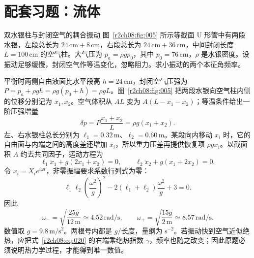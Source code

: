 \clearpage
\section{配套习题：流体}
\label{r2ch08:sec:practice}

\begin{practicebox}{双水银柱与封闭空气的耦合振动}
图~\ref{r2ch08:fig:005} 所示等截面 U 形管中有两段水银，左段总长为 $24\,\mathrm{cm}+8\,\mathrm{cm}$，右段总长为 $24\,\mathrm{cm}+36\,\mathrm{cm}$，中间封闭长度 $L=100\,\mathrm{cm}$ 的空气柱。大气压为 $p_a=\rho g p_0$，其中 $p_0=76\,\mathrm{cm}$，$\rho$ 是水银密度。设振动足够缓慢，封闭空气作等温变化，忽略阻力。求小振动的两个本征角频率。
\label{r2ch08:pr:001}
\begin{solution}
\figUTubeModes
平衡时两侧自由液面比水平段高 $h=24\,\mathrm{cm}$，封闭空气压强为
$P=p_a+\rho gh=\rho g(p_0+h)=\rho gL$。图~\ref{r2ch08:fig:005} 把两段水银向空气柱内侧的位移分别记为 $x_1,x_2$。空气体积从 $AL$ 变为 $A(L-x_1-x_2)$；等温条件给出一阶压强增量
\begin{equation}
 \delta p=P\frac{x_1+x_2}{L}=\rho g(x_1+x_2).
 \label{r2ch08:eq:020}
\end{equation}
左、右水银柱总长分别为 $\ell_1=0.32\,\mathrm m$、$\ell_2=0.60\,\mathrm m$。某段向内移动 $x_i$ 时，它的自由面与内端之间的高度差还增加 $x_i$，所以重力压差再提供恢复项 $\rho gx_i$。以截面积 $A$ 约去共同因子，运动方程为
\begin{equation}
 \ell_1\ddot x_1+g(2x_1+x_2)=0,
 \qquad
 \ell_2\ddot x_2+g(x_1+2x_2)=0.
 \label{r2ch08:eq:021}
\end{equation}
令 $x_i=X_i e^{i\omega t}$，非零振幅要求系数行列式为零：
\begin{equation}
 \ell_1\ell_2\left(\frac{\omega^2}{g}\right)^2
 -2(\ell_1+\ell_2)\frac{\omega^2}{g}+3=0.
 \label{r2ch08:eq:022}
\end{equation}
因此
\begin{equation}
 \boxed{\omega_- =\sqrt{\frac{25g}{12\,\mathrm m}}\simeq4.52\,\mathrm{rad/s}},
 \qquad
 \boxed{\omega_+ =\sqrt{\frac{15g}{2\,\mathrm m}}\simeq8.57\,\mathrm{rad/s}}.
 \label{r2ch08:eq:023}
\end{equation}
数值取 $g=9.8\,\mathrm{m/s^2}$。两根号内都是 $g/\text{长度}$，量纲为 $\mathrm{s^{-2}}$。若振动快到空气近似绝热，应把式~\eqref{r2ch08:eq:020} 的右端乘绝热指数 $\gamma$，频率也随之改变；因此原题必须说明热力学过程，才能得到唯一数值。
\end{solution}
\end{practicebox}

